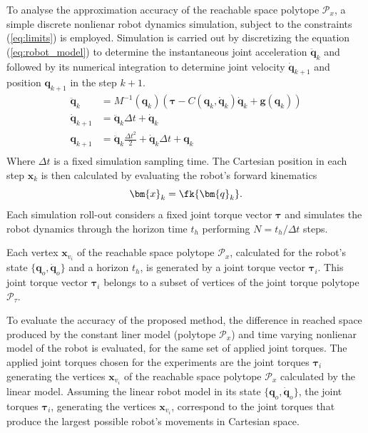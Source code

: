 To analyse the approximation accuracy of the  reachable space polytope $\mathcal{P}_x$, a simple discrete nonlienar robot dynamics simulation, subject to the constraints (\ref{eq:limits}) is employed. Simulation is carried out by discretizing the equation (\ref{eq:robot_model}) to determine the instantaneous joint acceleration $\ddot{\bm{q}}_{k}$ and followed by its numerical integration to determine joint velocity $\dot{\bm{q}}_{k+1}$ and position $\bm{q}_{k+1}$ in the step $k\!+\!1$. 
\begin{equation}
\begin{split}
    \ddot{\bm{q}}_{k} &= M^{-1}(\bm{q}_k)\left(\bm{\tau} - C(\bm{q}_k,\dot{\bm{q}}_k)\dot{\bm{q}}_k + \bm{g}(\bm{q}_k)\right)\\
    \dot{\bm{q}}_{k+1} &= \ddot{\bm{q}}_k\Delta t + \dot{\bm{q}}_{k}\\
    \bm{q}_{k+1} &= \ddot{\bm{q}}_k\frac{\Delta t^2}{2} + \dot{\bm{q}}_k\Delta t  + \bm{q}_{k}\\
\end{split}
\label{eq:simulation_imp}
\end{equation}
Where $\Delta t$ is a fixed simulation sampling time. The Cartesian position in each step $\bm{x}_{k}$ is then calculated by evaluating the  robot's forward kinematics
\begin{equation}
    \bm{x}_{k} =\fk{\bm{q}_{k}}.
\end{equation}
Each simulation roll-out considers a fixed joint torque vector $\bm{\tau}$ and simulates the robot dynamics through the horizon time $t_h$ performing $N= t_h/\Delta t$ steps.

Each vertex $\bm{x}_{v_i}$ of the reachable space polytope $\mathcal{P}_x$, calculated for the robot's state $\{\bm{q}_o,\dot{\bm{q}}_o\}$ and a horizon $t_h$, is generated by a joint torque vector $\bm{\tau}_i$. This joint torque vector $\bm{\tau}_i$ belongs to a subset of vertices of the joint torque polytope $\mathcal{P}_\tau$. 

To evaluate the accuracy of the proposed method, the difference in reached space produced by the constant liner model (polytope $\mathcal{P}_x$) and time varying nonlienar model of the robot is evaluated, for the same set of applied joint torques. The applied joint torques chosen for the experiments are the joint torques $\bm{\tau}_i$ generating the vertices $\bm{x}_{v_i}$ of the reachable space polytope $\mathcal{P}_x$ calculated by the linear model. Assuming the linear robot model in its state $\{\bm{q}_o,\dot{\bm{q}}_o\}$, the joint torques $\bm{\tau}_i$, generating the vertices $\bm{x}_{v_i}$, correspond to the joint torques that produce the largest possible robot's movements in Cartesian space.

